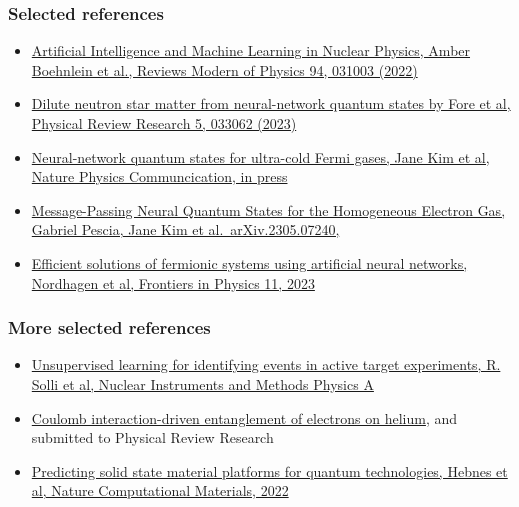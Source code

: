 \documentclass{beamer}
\begin{document}
\begin{frame}
\frametitle{Selected references}

\begin{block}{}
\begin{itemize}
\item \href{{https://journals.aps.org/rmp/abstract/10.1103/RevModPhys.94.031003}}{Artificial Intelligence and Machine Learning in Nuclear Physics, Amber Boehnlein et al., Reviews Modern of Physics 94, 031003 (2022)} 

\item \href{{https://journals.aps.org/prresearch/pdf/10.1103/PhysRevResearch.5.033062}}{Dilute neutron star matter from neural-network quantum states by Fore et al, Physical Review Research 5, 033062 (2023)}

\item \href{{https://doi.org/10.48550/arXiv.2305.08831}}{Neural-network quantum states for ultra-cold Fermi gases, Jane Kim et al, Nature Physics Communcication, in press}

\item \href{{https://doi.org/10.48550/arXiv.2305.07240}}{Message-Passing Neural Quantum States for the Homogeneous Electron Gas, Gabriel Pescia, Jane Kim et al.~arXiv.2305.07240,}

\item \href{{https://doi.org/10.3389/fphy.2023.1061580}}{Efficient solutions of fermionic systems using artificial neural networks, Nordhagen et al, Frontiers in Physics 11, 2023}
\end{itemize}

\noindent
\end{block}
\end{frame}

\begin{frame}
\frametitle{More selected references}

\begin{block}{}
\begin{itemize}
\item \href{{https://www.sciencedirect.com/science/article/abs/pii/S0168900221004460?via%

\item \href{{https://arxiv.org/abs/2310.04927}}{Coulomb interaction-driven entanglement of electrons on helium}, and submitted to Physical Review Research

\item \href{{https://www.nature.com/articles/s41524-022-00888-3}}{Predicting solid state material platforms for quantum technologies, Hebnes et al, Nature Computational Materials, 2022} 
\end{itemize}

\noindent
\end{block}
\end{frame}
\end{document}
